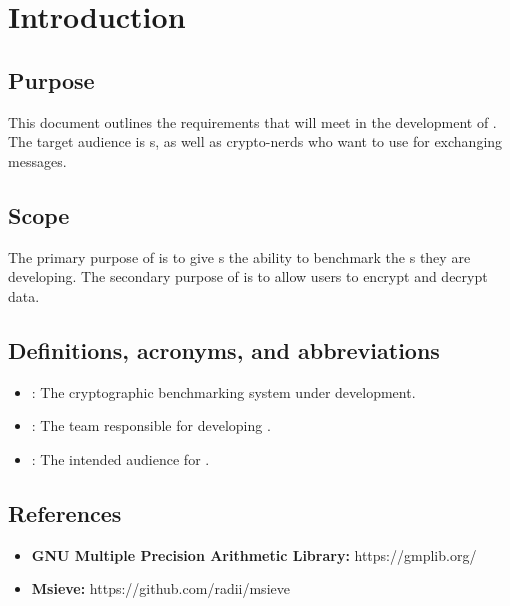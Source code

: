\section{Introduction}
\md


\subsection{Purpose}

This document outlines the requirements that \tc{} will meet
in the development of \cry{}. The target audience is \cg s,
as well as crypto-nerds who want to use
\cry{} for exchanging messages.


\subsection{Scope}

The primary purpose of \cry{} is to give \cg s the ability
to benchmark the \cs s they are developing. The secondary
purpose of \cry{} is to allow users to encrypt and decrypt
data.


\subsection{Definitions, acronyms, and abbreviations}

\begin{itemize}
\item \cry{}: The cryptographic benchmarking system under
      development.
\item \tc{}: The team responsible for developing \cry{}.
\item \cg : The intended audience for \cry{}.
\end{itemize}


\subsection{References}

\begin{itemize}
  \item \textbf{GNU Multiple Precision Arithmetic Library:}
        https://gmplib.org/
  \item \textbf{Msieve:} https://github.com/radii/msieve
\end{itemize}

